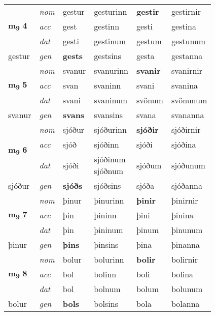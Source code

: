 \begin{longtable}[l]{X>{\footnotesize\itshape}XXXXX}
\multirow{3}{*}{{{\textbf{m{\textsubscript{9}}} \Large{\textbf{4}}}}} & nom & gestur & gesturinn & \textbf{gestir} & gestirnir \\*
 & acc & gest & gestinn & gesti & gestina \\*
 & dat & gesti & gestinum & gestum & gestunum \\*
 {\footnotesize{gestur}} & gen & \textbf{gests} & gestsins & gesta & gestanna \\
\cmidrule{1-6}

\multirow{3}{*}{{{\textbf{m{\textsubscript{9}}} \Large{\textbf{5}}}}} & nom & svanur & svanurinn & \textbf{svanir} & svanirnir \\*
 & acc & svan & svaninn & svani & svanina \\*
 & dat & svani & svaninum & svönum & svönunum \\*
 {\footnotesize{svanur}} & gen & \textbf{svans} & svansins & svana & svananna \\
\cmidrule{1-6}

\multirow{3}{*}{{{\textbf{m{\textsubscript{9}}} \Large{\textbf{6}}}}} & nom & sjóður & sjóðurinn & \textbf{sjóðir} & sjóðirnir \\*
 & acc & sjóð & sjóðinn & sjóði & sjóðina \\*
 & dat & sjóði & \specialcell{sjóðinum\\ sjóðnum} & sjóðum & sjóðunum \\*
 {\footnotesize{sjóður}} & gen & \textbf{sjóðs} & sjóðsins & sjóða & sjóðanna \\
\cmidrule{1-6}

\multirow{3}{*}{{{\textbf{m{\textsubscript{9}}} \Large{\textbf{7}}}}} & nom & þinur & þinurinn & \textbf{þinir} & þinirnir \\*
 & acc & þin & þininn & þini & þinina \\*
 & dat & þin & þininum & þinum & þinunum \\*
 {\footnotesize{þinur}} & gen & \textbf{þins} & þinsins & þina & þinanna \\
\cmidrule{1-6}

\multirow{3}{*}{{{\textbf{m{\textsubscript{9}}} \Large{\textbf{8}}}}} & nom & bolur & bolurinn & \textbf{bolir} & bolirnir \\*
 & acc & bol & bolinn & boli & bolina \\*
 & dat & bol & bolnum & bolum & bolunum \\*
 {\footnotesize{bolur}} & gen & \textbf{bols} & bolsins & bola & bolanna \\
\cmidrule{1-6}


\end{longtable}
